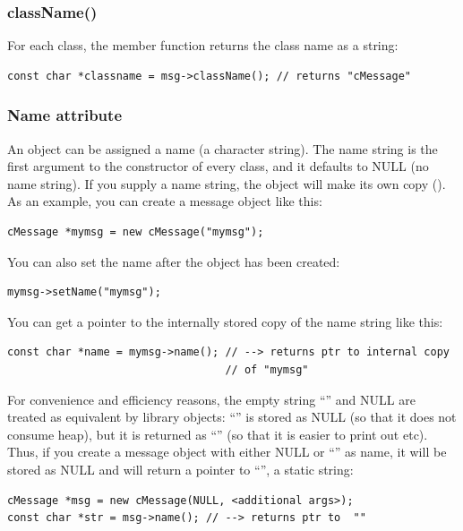 \subsubsection{className()}


For each class, the  member function returns the class
name as a string:

\begin{verbatim}
const char *classname = msg->className(); // returns "cMessage"
\end{verbatim}

\subsubsection{Name attribute}


An object can be assigned a name (a character string). The name
string is the first argument to the constructor of every class,
and it defaults to NULL (no name string). If you supply a name
string, the object will make its own copy (). As an example,
you can create a message object like this:

\begin{verbatim}
cMessage *mymsg = new cMessage("mymsg");
\end{verbatim}


You can also set the name after the object has been created:

\begin{verbatim}
mymsg->setName("mymsg");
\end{verbatim}

You can get a pointer to the internally stored copy of the name
string like this:

\begin{verbatim}
const char *name = mymsg->name(); // --> returns ptr to internal copy
                                  // of "mymsg"
\end{verbatim}


For convenience and efficiency reasons, the empty string ``''
and NULL are treated as equivalent by library objects: ``''
is stored as NULL (so that it does not consume heap), but it
is returned as ``'' (so that it is easier to print
out etc). Thus, if you create a message object with either NULL
or ``'' as name, it will be stored as NULL and 
will return a pointer to ``'', a static string:

\begin{verbatim}
cMessage *msg = new cMessage(NULL, <additional args>);
const char *str = msg->name(); // --> returns ptr to  ""
\end{verbatim}


